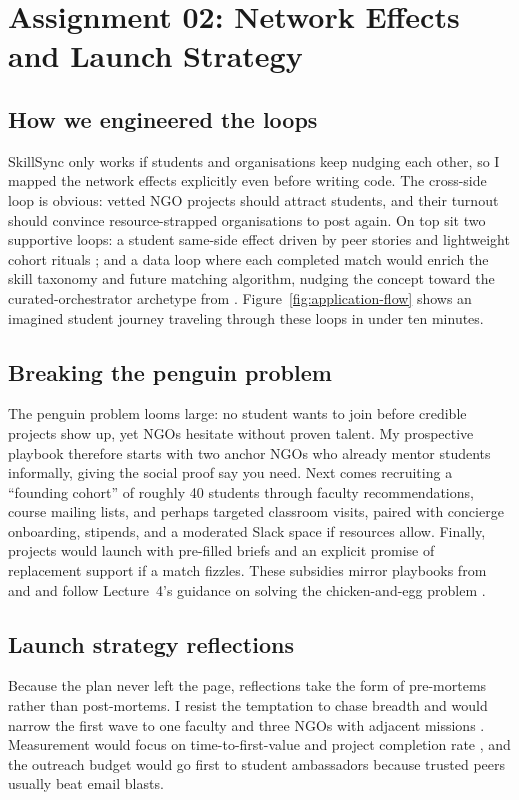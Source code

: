 \section*{Assignment 02: Network Effects and Launch Strategy}

\subsection*{How we engineered the loops}
SkillSync only works if students and organisations keep nudging each other, so I mapped the network effects explicitly even before writing code. The cross-side loop is obvious: vetted NGO projects should attract students, and their turnout should convince resource-strapped organisations to post again. On top sit two supportive loops: a student same-side effect driven by peer stories and lightweight cohort rituals \citep{Choudary2016}; and a data loop where each completed match would enrich the skill taxonomy and future matching algorithm, nudging the concept toward the curated-orchestrator archetype from \citet{Reillier2017}. Figure~\ref{fig:application-flow} shows an imagined student journey traveling through these loops in under ten minutes.

\subsection*{Breaking the penguin problem}
The penguin problem looms large: no student wants to join before credible projects show up, yet NGOs hesitate without proven talent. My prospective playbook therefore starts with two anchor NGOs who already mentor students informally, giving the social proof \citet{HagiuWright2013} say you need. Next comes recruiting a ``founding cohort'' of roughly 40 students through faculty recommendations, course mailing lists, and perhaps targeted classroom visits, paired with concierge onboarding, stipends, and a moderated Slack space if resources allow. Finally, projects would launch with pre-filled briefs and an explicit promise of replacement support if a match fizzles. These subsidies mirror playbooks from \citet{Gunasilan2024} and \citet{FarrellSaloner1986} and follow Lecture~4's guidance on solving the chicken-and-egg problem \citep{Lecture04}.

\subsection*{Launch strategy reflections}
Because the plan never left the page, reflections take the form of pre-mortems rather than post-mortems. I resist the temptation to chase breadth and would narrow the first wave to one faculty and three NGOs with adjacent missions \citep{Choudary2016}. Measurement would focus on time-to-first-value and project completion rate \citep{ShapiroVarian1999}, and the outreach budget would go first to student ambassadors because trusted peers usually beat email blasts.


